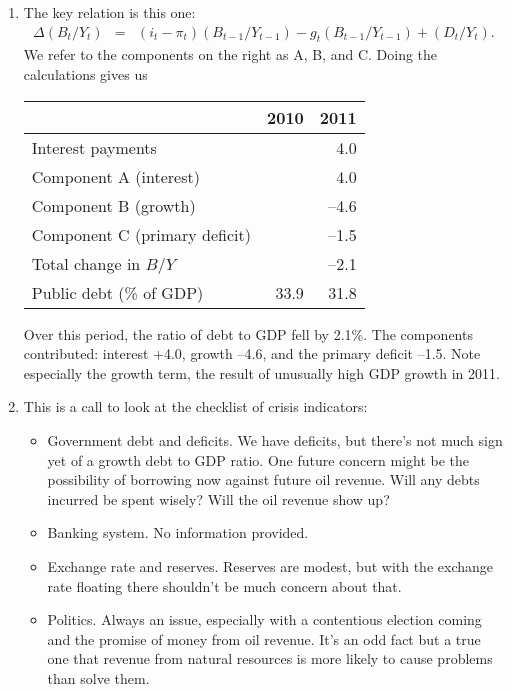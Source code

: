 \begin{enumerate}
\begin{enumerate}
\item The key relation is this one:
\begin{eqnarray*}
    \Delta ({B_{t}}/{Y_{t}})
            &=&
                (i_t-\pi_t) ({B_{t-1}}/{Y_{t-1}})
                - g_t ({B_{t-1}}/{Y_{t-1}})
             +    ({D_{t}}/{Y_{t}})  .
\end{eqnarray*}
We refer to the components on the right as A, B, and C.
Doing the calculations gives us

\begin{center}
\begin{tabular}{lrr}
\toprule
        &  2010 & 2011   \\
\midrule
Interest payments  &  &  4.0  \\
Component A (interest)  &  &  4.0  \\
Component B (growth)            &   & --4.6  \\
Component C (primary deficit)   &   & --1.5  \\
Total change in $B/Y$       &       & --2.1   \\
Public debt (\% of GDP)     &  33.9 & 31.8   \\
\bottomrule
\end{tabular}
\end{center}

Over this period, the ratio of debt to GDP fell by 2.1\%.
The components contributed:
interest +4.0, growth --4.6, and the primary deficit --1.5.
Note especially the growth term, the result of unusually high GDP growth in 2011.

\item This is a call to look at the checklist of crisis indicators:
\begin{itemize}
\item Government debt and deficits.
We have deficits, but there's not
much sign yet of a growth debt to GDP ratio.
One future concern might be the possibility of borrowing now against future oil
revenue.  Will any debts incurred be spent wisely?
Will the oil revenue show up?
\item Banking system.  No information provided.
\item Exchange rate and reserves.  Reserves are modest,
but with the exchange rate floating there shouldn't be much
concern about that.
\item Politics.  Always an issue,
especially with a contentious election coming
and the promise of money from oil revenue.
It's an odd fact but a true one that revenue
from natural resources is more likely to cause problems than solve them.
\end{itemize}
\end{enumerate}

\end{enumerate}
\setlength{\leftmargini}{\oldleftmargini}


